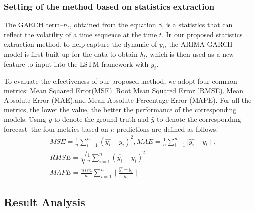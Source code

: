 \subsubsection{Setting of the method based on statistics extraction} The GARCH term--$h_t$, obtained from the equation 8, is a statistics that can reflect the volatility of a time sequence at the time $t$. In our proposed statistics extraction method, to help capture the dynamic of $y_t$, the ARIMA-GARCH model is first built up for the data to obtain $h_t$, which is then used as a new feature to input into the LSTM framework with $y_t$.



To evaluate the effectiveness of our proposed method, we adopt four common metrics:  Mean Squared Error(MSE), Root Mean Squared Error (RMSE), Mean Absolute Error (MAE),and Mean Absolute Percentage Error (MAPE).  For all the metrics, the lower the value, the better the performance of the corresponding models. Using $y$ to denote the ground truth and $\hat{y}$ to denote the corresponding forecast,  the four metrics based on $n$ predictions are defined as follows: 
\begin{eqnarray}
&&  MSE=\frac{1}{n}\sum_{i=1}^{n}(\hat{y_i}-y_i)^2,  MAE = \frac{1}{n}\sum_{i=1}^{n}{\mid\hat{y_i}-y_t\mid}, \nonumber\\
&& RMSE = \sqrt{\frac{1}{n}\sum_{i=1}^{n}({\hat{y_i}-y_i})^2} \nonumber\\
&& MAPE = \frac{100\%}{n}\sum_{i=1}^{n} \mid\frac{\hat{y_i}-y_i}{y_i}\mid
\end{eqnarray}
\subsection{Result Analysis}


